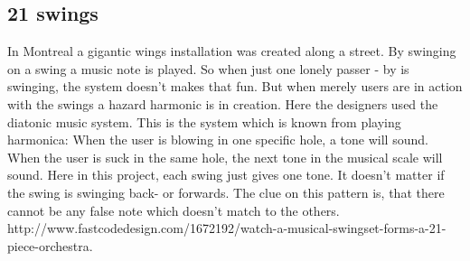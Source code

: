 \subsection{21 swings}


In Montreal a gigantic wings installation was created along a street.\newline
By swinging on a swing a music note is played. So when just one lonely passer - by is swinging, the system doesn't makes that fun. But when merely users are in action with the swings a hazard harmonic is in creation. \newline
Here the designers used the diatonic music system. This is the system which is known from playing harmonica: When the user is blowing in one specific hole, a tone will sound. When the user is suck in the same hole, the next tone in the musical scale will sound. Here in this project, each swing just gives one tone. It doesn't matter if the swing is swinging back- or forwards. The clue on this pattern is, that there cannot be any false note which doesn't match to the others.\newline
\newline
http://www.fastcodedesign.com/1672192/watch-a-musical-swingset-forms-a-21-piece-orchestra.                
